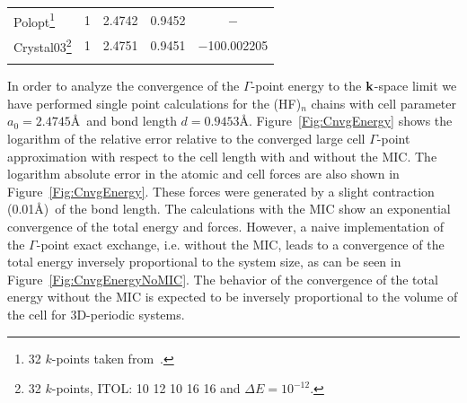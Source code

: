 \documentclass[prl,twocolumn,showpacs,twocolumngrid,superbib]{revtex4}
\begin{document}
\begin{table}[t]
\begin{tabular}{lrllc}
%
%
    \hline
    {\sc Polopt}\footnote[2]{32 $k$-points taken from~\cite{DJacquemin99B}.} 
    & 1 & 2.4742 & 0.9452  & $-$\\
    {\sc Crystal03}\footnote[3]{32 $k$-points, ITOL: 10 12 10 16 16 and $\Delta E=10^{-12}$.}
    & 1 & 2.4751 & 0.9451 & $-$100.002205\\
    \botrule
  \end{tabular}
\end{table}

In order to analyze the convergence of the $\Gamma$-point energy to the ${\bf k}$-space limit
we have performed single point calculations for the 
(HF)$_n$ chains with cell parameter $a_0=2.4745$\AA~and bond length $d=0.9453$\AA.
Figure~\ref{Fig:CnvgEnergy} shows the logarithm of the relative error relative to the 
converged large cell $\Gamma$-point approximation
with respect to the cell length with and without the MIC.
The logarithm absolute error in the atomic and cell forces
are also shown in Figure~\ref{Fig:CnvgEnergy}.
These forces were generated by a slight contraction (0.01\AA)~of the bond length.
The calculations with the MIC show an exponential convergence of the total
energy and forces. However, a naive implementation of 
the $\Gamma$-point exact exchange, i.e. without the MIC, leads to a convergence 
of the total energy inversely proportional to the system size, as can be seen 
in Figure~\ref{Fig:CnvgEnergyNoMIC}. The behavior of the convergence of the total energy
without the MIC is expected to be inversely proportional to the volume of the 
cell for 3D-periodic systems.
\end{document}
